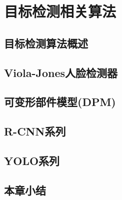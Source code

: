 \section{目标检测相关算法}
\setcounter{figure}{0}

\subsection{目标检测算法概述}

\subsection{Viola-Jones人脸检测器}

\subsection{可变形部件模型(DPM)}

\subsection{R-CNN系列}

\subsection{YOLO系列}

\subsection{本章小结}








